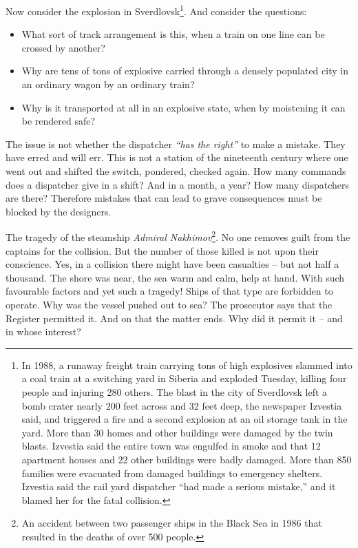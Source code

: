 \documentclass[openright]{bookest}
\begin{document}
Now consider the explosion in Sverdlovsk\footnote{In 1988, a runaway freight train carrying tons of high explosives slammed into a coal train at a switching yard in Siberia and exploded Tuesday, killing four people and injuring \num{280} others. The blast in the city of Sverdlovsk left a bomb crater nearly \num{200} feet across and \num{32} feet deep, the newspaper Izvestia said, and triggered a fire and a second explosion at an oil storage tank in the yard. More than \num{30} homes and other buildings were damaged by the twin blasts. Izvestia said the entire town was engulfed in smoke and that \num{12} apartment houses and \num{22} other buildings were badly damaged. More than \num{850} families were evacuated from damaged buildings to emergency shelters. Izvestia said the rail yard dispatcher ``had made a serious mistake,'' and it blamed her for the fatal collision.}. And consider the questions:

\begin{itemize}
\item What sort of track arrangement is this, when a train on one line can be crossed by another?
\item Why are tens of tons of explosive carried through a densely populated city in an ordinary wagon by an ordinary train?
\item Why is it transported at all in an explosive state, when by moistening it can be rendered safe?
\end{itemize}

The issue is not whether the dispatcher \textit{``has the right''} to make a mistake. They have erred and will err. This is not a station of the nineteenth century where one went out and shifted the switch, pondered, checked again. How many commands does a dispatcher give in a shift? And in a month, a year? How many dispatchers are there? Therefore mistakes that can lead to grave consequences must be blocked by the designers.

The tragedy of the steamship \textit{Admiral Nakhimov}\footnote{An accident between two passenger ships in the Black Sea in 1986 that resulted in the deaths of over \num{500} people.}. No one removes guilt from the captains for the collision. But the number of those killed is not upon their conscience. Yes, in a collision there might have been casualties -- but not half a thousand. The shore was near, the sea warm and calm, help at hand. With such favourable factors and yet such a tragedy! Ships of that type are forbidden to operate. Why was the vessel pushed out to sea? The prosecutor says that the Register permitted it. And on that the matter ends. Why did it permit it -- and in whose interest?
\end{document}
